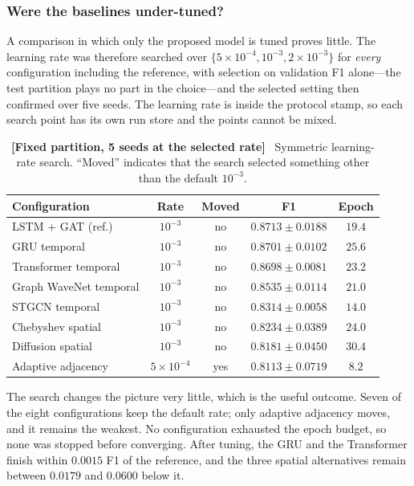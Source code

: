 \documentclass[journal]{IEEEtran}
\begin{document}
\subsubsection{Were the baselines under-tuned?}
A comparison in which only the proposed model is tuned proves little. The  %
learning rate was therefore searched over $\{5 \times 10^{-4}, 10^{-3},
2 \times 10^{-3}\}$ for \emph{every} configuration including the reference,
with selection on validation F1 alone---the test partition plays no part in
the choice---and the selected setting then confirmed over five seeds. The
learning rate is inside the protocol stamp, so each search point has its own
run store and the points cannot be mixed.

\begin{table}[!htbp]
  \centering
  \caption{\textbf{[Fixed partition, 5 seeds at the selected rate]}~ Symmetric
  learning-rate search. ``Moved'' indicates that the search selected something
  other than the default $10^{-3}$.}
  \label{tab:baseline_search}
  \renewcommand{\arraystretch}{1.15}
  \footnotesize
  \setlength{\tabcolsep}{3pt}
  \begin{tabular}{@{}lcccc@{}}
    \toprule
    \textbf{Configuration} & \textbf{Rate} & \textbf{Moved}
    & \textbf{F1} & \textbf{Epoch} \\ \midrule
    LSTM + GAT (ref.) & $10^{-3}$ & no & $0.8713 \pm 0.0188$ & $19.4$ \\
    GRU temporal & $10^{-3}$ & no & $0.8701 \pm 0.0102$ & $25.6$ \\
    Transformer temporal & $10^{-3}$ & no & $0.8698 \pm 0.0081$ & $23.2$ \\
    Graph WaveNet temporal & $10^{-3}$ & no & $0.8535 \pm 0.0114$ & $21.0$ \\
    STGCN temporal & $10^{-3}$ & no & $0.8314 \pm 0.0058$ & $14.0$ \\
    Chebyshev spatial & $10^{-3}$ & no & $0.8234 \pm 0.0389$ & $24.0$ \\
    Diffusion spatial & $10^{-3}$ & no & $0.8181 \pm 0.0450$ & $30.4$ \\
    Adaptive adjacency & $5 \times 10^{-4}$ & yes & $0.8113 \pm 0.0719$ & $8.2$ \\
    \bottomrule
  \end{tabular}
\end{table}

The search changes the picture very little, which is the useful outcome. Seven
of the eight configurations keep the default rate; only adaptive adjacency
moves, and it remains the weakest. No configuration exhausted the epoch
budget, so none was stopped before converging. After tuning, the GRU and the
Transformer finish within $0.0015$ F1 of the reference, and the three spatial
alternatives remain between $0.0179$ and $0.0600$ below it.
\end{document}
